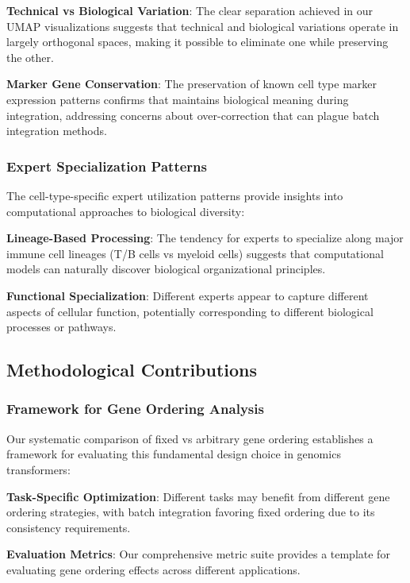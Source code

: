 \textbf{Technical vs Biological Variation}: The clear separation achieved in our UMAP visualizations suggests that technical and biological variations operate in largely orthogonal spaces, making it possible to eliminate one while preserving the other.

\textbf{Marker Gene Conservation}: The preservation of known cell type marker expression patterns confirms that \bioformer{} maintains biological meaning during integration, addressing concerns about over-correction that can plague batch integration methods.

\subsubsection{Expert Specialization Patterns}

The cell-type-specific expert utilization patterns provide insights into computational approaches to biological diversity:

\textbf{Lineage-Based Processing}: The tendency for experts to specialize along major immune cell lineages (T/B cells vs myeloid cells) suggests that computational models can naturally discover biological organizational principles.

\textbf{Functional Specialization}: Different experts appear to capture different aspects of cellular function, potentially corresponding to different biological processes or pathways.

\subsection{Methodological Contributions}

\subsubsection{Framework for Gene Ordering Analysis}

Our systematic comparison of fixed vs arbitrary gene ordering establishes a framework for evaluating this fundamental design choice in genomics transformers:

\textbf{Task-Specific Optimization}: Different tasks may benefit from different gene ordering strategies, with batch integration favoring fixed ordering due to its consistency requirements.

\textbf{Evaluation Metrics}: Our comprehensive metric suite provides a template for evaluating gene ordering effects across different applications.

